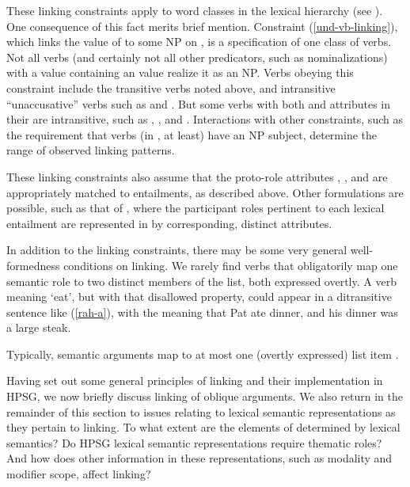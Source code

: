 \documentclass[output=paper,biblatex,babelshorthands,newtxmath,draftmode,colorlinks, citecolor=brown]{langscibook}
\begin{document}
These linking constraints apply to word classes in the lexical hierarchy (see
).  One consequence of this fact merits brief mention.  Constraint
(\ref{und-vb-linking}), which links the value of  to some NP on \argst, is a specification
of one class of verbs.  Not all verbs (and certainly not all other predicators, such as
nominalizations) with a \content value containing an  value realize it as an NP.  Verbs
obeying this constraint include the transitive verbs noted above, and intransitive ``unaccusative''
verbs such as  and .  But some verbs with both  and 
attributes in their \content are intransitive, such as , , and
.  Interactions with other constraints, such as the requirement that verbs (in
, at least) have an NP subject, determine the range of observed linking patterns.

These linking constraints also assume that the proto-role attributes , , and  are
appropriately matched to entailments, as described above.  Other formulations are possible, such as
that of \citet{KoenigandDavis2003}, where the participant roles pertinent to each lexical entailment are represented in
\content by corresponding, distinct attributes.

In addition to the linking constraints, there may be some very general well-formedness conditions on
linking. We rarely find verbs that obligatorily map  one semantic role to two  distinct members of
the \argst list, both expressed overtly.  A verb meaning `eat', but  with that disallowed property,
could appear in a ditransitive sentence like  (\ref{rah-a}), with the meaning that Pat ate dinner,
and his dinner was a large steak.

\begin{exe}
\end{exe}

\noindent
Typically, semantic arguments map to at most one (overtly expressed) \argst list item \citep[262--268]{Davis2001}.

Having set out some general principles of linking and their implementation in HPSG, we now briefly discuss linking of oblique arguments.
We also return in the remainder of this section to issues relating to lexical semantic representations as they pertain to linking.
To what extent are the elements of \argst determined by lexical semantics?
Do HPSG lexical semantic representations require thematic roles?
And how does other information in these representations, such as modality and modifier scope, affect linking?
\end{document}
